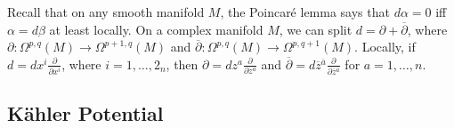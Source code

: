 Recall that on any smooth manifold $M$, the Poincaré lemma says that $d\alpha = 0$ iff $\alpha = d \beta$ at least locally.
On a complex manifold $M$, we can split $d = \partial + \overline{\partial}{}$, where $\partial \colon \Omega^{p, q}(M) \to \Omega^{p + 1, q}(M)$ and $\overline{\partial}{}\colon \Omega^{p, q}(M) \to \Omega^{p, q+ 1}(M)$.
Locally, if $d = dx^{i} \frac{\partial }{\partial x^{i}}$, where $i = 1, \dots, 2_n$, then $\partial = dz^a \frac{\partial }{\partial z^{a}}$ and $\overline{\partial}{} = d \overline{z}{}^{\overline{a}{}} \frac{\partial }{\partial \overline{z}{}^{\overline{a}{}}}$ for $a = 1, \dots, n$.

\subsection{Kähler Potential}%
\label{sub:kahler_potential}


